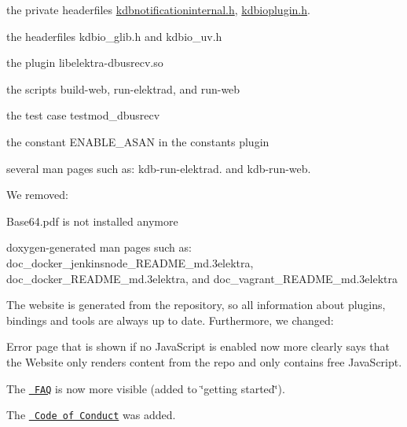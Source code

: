 \begin{DoxyItemize}
\item the private headerfiles {\ttfamily \mbox{\hyperlink{kdbnotificationinternal_8h}{kdbnotificationinternal.\+h}}}, {\ttfamily \mbox{\hyperlink{kdbioplugin_8h}{kdbioplugin.\+h}}}.
\item the headerfiles {\ttfamily kdbio\+\_\+glib.\+h} and {\ttfamily kdbio\+\_\+uv.\+h}
\item the plugin {\ttfamily libelektra-\/dbusrecv.\+so}
\item the scripts {\ttfamily build-\/web}, {\ttfamily run-\/elektrad}, and {\ttfamily run-\/web}
\item the test case {\ttfamily testmod\+\_\+dbusrecv}
\item the constant {\ttfamily E\+N\+A\+B\+L\+E\+\_\+\+A\+S\+AN} in the constants plugin
\item several man pages such as\+: {\ttfamily kdb-\/run-\/elektrad.} and {\ttfamily kdb-\/run-\/web.}
\end{DoxyItemize}

We removed\+:


\begin{DoxyItemize}
\item {\ttfamily Base64.\+pdf} is not installed anymore
\item doxygen-\/generated man pages such as\+: {\ttfamily doc\+\_\+docker\+\_\+jenkinsnode\+\_\+\+R\+E\+A\+D\+M\+E\+\_\+md.\+3elektra}, {\ttfamily doc\+\_\+docker\+\_\+\+R\+E\+A\+D\+M\+E\+\_\+md.\+3elektra}, and {\ttfamily doc\+\_\+vagrant\+\_\+\+R\+E\+A\+D\+M\+E\+\_\+md.\+3elektra}
\end{DoxyItemize}

The website is generated from the repository, so all information about plugins, bindings and tools are always up to date. Furthermore, we changed\+:


\begin{DoxyItemize}
\item Error page that is shown if no Java\+Script is enabled now more clearly says that the Website only renders content from the repo and only contains free Java\+Script.
\item The \href{https://www.libelektra.org/docgettingstarted/faq}{\texttt{ F\+AQ}} is now more visible (added to \char`\"{}getting started\char`\"{}).
\item The \href{https://www.libelektra.org/devgettingstarted/code-of-conduct}{\texttt{ Code of Conduct}} was added.
\end{DoxyItemize}

